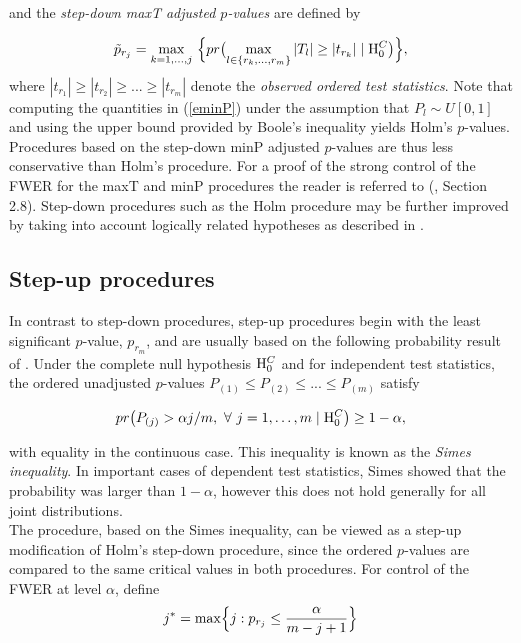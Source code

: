 \documentclass[11pt]{article}
\newcommand{\scst}{\scriptstyle}
\begin{document}
and the {\it step-down maxT adjusted $p$-values} are defined by

\begin{equation}\label{emaxTd}
\tilde{p}_{\scst r_j} = \max_{k = 1,\ldots, j}\ \Bigl\{ pr\bigl( \max_{l \in \{r_k,\ldots,r_m\}} |T_l| \geq |t_{\scst r_k}| \mid {\rm H}_0^C \bigr) \Bigr\},
\end{equation}
where $|t_{\scst r_1}| \geq |t_{\scst r_2}| \geq ... \geq |t_{\scst
  r_m}|$ denote the {\it observed ordered test statistics}. Note that
  computing the quantities in (\ref{eminP}) under the assumption that
  $P_l \sim U[0,1]$ and using the upper bound provided by Boole's
  inequality yields Holm's $p$-values. Procedures based on the
  step-down minP adjusted $p$-values are thus less conservative than
  Holm's procedure. For a proof of the strong control of the FWER for
  the maxT and minP procedures the reader is referred to (\cite{Westfall&Young93}, Section 2.8). Step-down procedures such as the Holm procedure may be further improved by taking into account logically related hypotheses as described in \cite{Shaffer86}.


\subsection{Step-up procedures}

In contrast to step-down procedures, step-up procedures begin with the
least significant $p$-value, $p_{\scst r_m}$, and are usually based on
the following probability result of \cite{Simes86}. Under the
complete null hypothesis ${\rm H}_0^C$ and for independent test
statistics, the ordered unadjusted $p$-values $P_{(1)} \leq
P_{(2)} \leq ... \leq P_{(m)}$ satisfy 

$$pr \bigl(P_{(j)} > \alpha j/m,\ \forall\ j= 1, \ldots, m \mid {\rm H}_0^C \bigr) \geq 1- \alpha,$$ 

with equality in the continuous case. This inequality is known as the {\it Simes inequality}. In important cases of dependent test statistics, Simes showed that the probability was larger than $1-\alpha$, however this does not hold generally for all joint distributions.\\

The \cite{Hochberg88} procedure, based on the Simes inequality, can be viewed as a step-up modification of Holm's step-down procedure, since the ordered $p$-values are compared to the same critical values in both procedures. For control of the FWER at level $\alpha$, define 
$$ j^* = \max \Bigl\{j: p_{\scst r_j} \leq \frac{\alpha}{m-j+1}\Bigr\}$$
\end{document}
